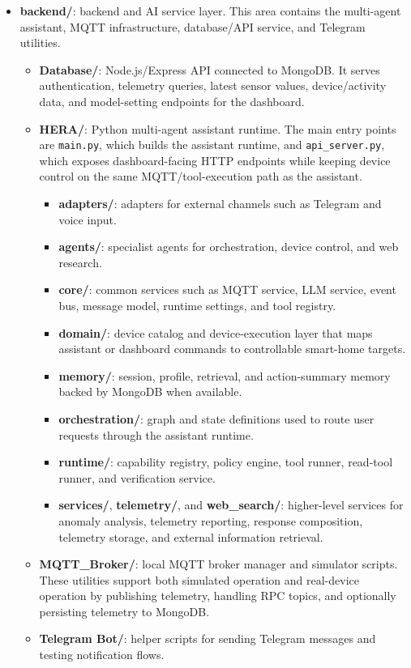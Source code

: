 \begin{itemize}
  \item \textbf{backend/}: backend and AI service layer. This area contains the multi-agent assistant, MQTT infrastructure, database/API service, and Telegram utilities.
    \begin{itemize}
      \item \textbf{Database/}: Node.js/Express API connected to MongoDB. It serves authentication, telemetry queries, latest sensor values, device/activity data, and model-setting endpoints for the dashboard.
      \item \textbf{HERA/}: Python multi-agent assistant runtime. The main entry points are \texttt{main.py}, which builds the assistant runtime, and \texttt{api\_server.py}, which exposes dashboard-facing HTTP endpoints while keeping device control on the same MQTT/tool-execution path as the assistant.
        \begin{itemize}
          \item \textbf{adapters/}: adapters for external channels such as Telegram and voice input.
          \item \textbf{agents/}: specialist agents for orchestration, device control, and web research.
          \item \textbf{core/}: common services such as MQTT service, LLM service, event bus, message model, runtime settings, and tool registry.
          \item \textbf{domain/}: device catalog and device-execution layer that maps assistant or dashboard commands to controllable smart-home targets.
          \item \textbf{memory/}: session, profile, retrieval, and action-summary memory backed by MongoDB when available.
          \item \textbf{orchestration/}: graph and state definitions used to route user requests through the assistant runtime.
          \item \textbf{runtime/}: capability registry, policy engine, tool runner, read-tool runner, and verification service.
          \item \textbf{services/}, \textbf{telemetry/}, and \textbf{web\_search/}: higher-level services for anomaly analysis, telemetry reporting, response composition, telemetry storage, and external information retrieval.
        \end{itemize}
      \item \textbf{MQTT\_Broker/}: local MQTT broker manager and simulator scripts. These utilities support both simulated operation and real-device operation by publishing telemetry, handling RPC topics, and optionally persisting telemetry to MongoDB.
      \item \textbf{Telegram Bot/}: helper scripts for sending Telegram messages and testing notification flows.
    \end{itemize}


\end{itemize}
